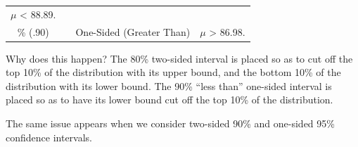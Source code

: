 \documentclass[
]{book}
\begin{document}
\begin{longtable}[]{@{}cccc@{}}
\begin{minipage}[t]{0.35\columnwidth}
\(\mu\) \textless{} 88.89.\strut
\end{minipage}\tabularnewline
\begin{minipage}[t]{0.13\columnwidth}\centering
90\% (.90)\strut
\end{minipage} & \begin{minipage}[t]{0.08\columnwidth}\centering
0.10\strut
\end{minipage} & \begin{minipage}[t]{0.32\columnwidth}\centering
One-Sided (Greater Than)\strut
\end{minipage} & \begin{minipage}[t]{0.35\columnwidth}\centering
\(\mu\) \textgreater{} 86.98.\strut
\end{minipage}\tabularnewline
\bottomrule
\end{longtable}

Why does this happen? The 80\% two-sided interval is placed so as to cut off the top 10\% of the distribution with its upper bound, and the bottom 10\% of the distribution with its lower bound. The 90\% ``less than'' one-sided interval is placed so as to have its lower bound cut off the top 10\% of the distribution.

The same issue appears when we consider two-sided 90\% and one-sided 95\% confidence intervals.
\end{document}

